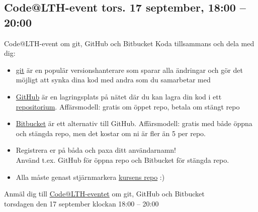 \documentclass{lecturenotes}
\begin{document}
\subsection{Code@LTH-event tors. 17 september, 18:00 – 20:00}
\begin{Slide}{Code@LTH-event om git, GitHub och Bitbucket}\footnotesize
Koda tillsammans och dela med dig:
\begin{itemize}
\item \href{https://git-scm.com/}{git} är en populär versionshanterare som sparar alla ändringar  och gör det möjligt att synka dina kod med andra som du samarbetar med
\item \href{https://github.com/}{GitHub} är en lagringsplats på nätet där du kan lagra din kod i ett \href{https://en.wikipedia.org/wiki/Repository_\%28version_control\%29}{repositorium}. Affärsmodell: gratis om öppet repo, betala om stängt repo
\item \href{https://bitbucket.org/}{Bitbucket} är ett alternativ till GitHub. Affärsmodell: gratis med både öppna och stängda repo, men det kostar om ni är fler än 5 per repo.
\item Registrera er på båda och paxa ditt användarnamn! \\ Använd t.ex. GitHub för öppna repo och Bitbucket för stängda repo. 
\item Alla måste genast stjärnmarkera \href{https://github.com/bjornregnell/lth-eda016-2015}{kursens repo} :) 
\end{itemize}
Anmäl dig till \href{http://www.codeatlth.org/}{Code@LTH-eventet} om git, GitHub och Bitbucket\\torsdagen den 17 september klockan 18:00 – 20:00
\end{Slide}
\end{document}
